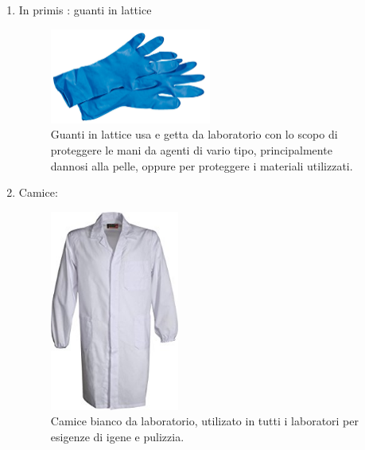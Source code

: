 \documentclass{article}
\begin{document}
	\begin{enumerate}

		\item In primis : guanti in lattice

		\begin{figure}[H]

			\includegraphics[width=0.5\textwidth]{./immagini/guanti.jpg}
			\caption{Guanti in lattice usa e getta da laboratorio con lo scopo di proteggere le mani da agenti di vario tipo, principalmente dannosi alla pelle,
			oppure per proteggere i materiali utilizzati.}
			\label{guanti}

		\end{figure}

		\vspace{0.5cm}


		\item Camice:

		\begin{figure}[H]

			\includegraphics[width=0.4\textwidth]{./immagini/camice.jpg}
			\caption{Camice bianco da laboratorio, utilizato in tutti i laboratori per esigenze di igene e pulizzia.}
			\label{camice}

		\end{figure}

		\vspace{0.5cm}



\end{enumerate}
\end{document}
